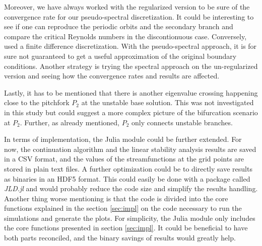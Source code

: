 Moreover, we have always worked with the regularized version to be sure of the
convergence rate for our pseudo-spectral discretization. It could be
interesting to see if one can reproduce the periodic orbits and the secondary
branch and compare the critical Reynolds numbers in the discontionuous case.
Conversely, \citet{chen2013} used a finite difference discretization. With the
pseudo-spectral approach, it is for sure not guaranteed to get a useful
approximation of the original boundary conditions. Another strategy
is trying the spectral approach on the un-regularized version and seeing how
the convergence rates and results are affected.

Lastly, it has to be mentioned that there is another eigenvalue crossing
happening close to the pitchfork $P_2$ at the unstable base solution. This was
not investigated in this study but could suggest a more complex picture of the
bifurcation scenario at $P_2$. Further, as already mentioned, $P_2$ only
connects unstable branches.

In terms of implementation, the Julia module could be further extended. For
now, the continuation algorithm and the linear stability analysis results are
saved in a CSV format, and the values of the streamfunctions at the grid points
are stored in plain text files. A further optimization could be to directly
save results as binaries in an HDF5 format. This could easily be done with a
package called \emph{JLD.jl} and would probably reduce the code size and
simplify the results handling. Another thing worse mentioning is that the code
is divided into the core functions explained in the section \ref{sec:impl} on
the code necessary to run the simulations and generate the plots. For
simplicity, the Julia module only includes the core functions presented in
section \ref{sec:impl}. It could be beneficial to have both parts reconciled,
and the binary savings of results would greatly help.

